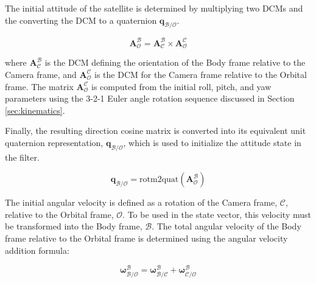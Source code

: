 
The initial attitude of the satellite is determined by multiplying two DCMs and the converting the DCM to a quaternion $\mathbf{q}_\mathcal{B/O} $.

\begin{equation}
    \mathbf{A}_\mathcal{O}^\mathcal{B} = \mathbf{A}_\mathcal{C}^\mathcal{B} \times \mathbf{A}_\mathcal{O}^\mathcal{C} 
\end{equation}

\noindent
where $\mathbf{A}_\mathcal{C}^\mathcal{B}$ is the DCM defining the orientation of the Body frame relative to the Camera frame, and $\mathbf{A}_\mathcal{O}^\mathcal{C}$ 
is the DCM for the Camera frame relative to the Orbital frame. The matrix $\mathbf{A}_\mathcal{O}^\mathcal{C}$ is computed from the initial roll, pitch, and 
yaw parameters using the 3-2-1 Euler angle rotation sequence discussed in Section \ref{sec:kinematics}.
\vspace{0.5cm}

\noindent
Finally, the resulting direction cosine matrix is converted into its equivalent unit quaternion representation, $\mathbf{q}_\mathcal{B/O}$, which is used to initialize the attitude state in the filter.

\begin{equation*}
    \mathbf{q}_\mathcal{B/O} = \text{rotm2quat}(\mathbf{A}_\mathcal{O}^\mathcal{B})
\end{equation*}


The initial angular velocity is defined as a rotation of the Camera frame, $\mathcal{C}$, relative to the Orbital frame, $\mathcal{O}$. To be used in the state vector, this velocity must be transformed into the Body frame, $\mathcal{B}$. The total angular velocity of the Body frame relative to the Orbital frame is determined using the angular velocity addition formula:

\begin{equation}
    \boldsymbol{\omega}_{\mathcal{B/O}}^{\mathcal{B}} = \boldsymbol{\omega}_{\mathcal{B/C}}^{\mathcal{B}} + \boldsymbol{\omega}_{\mathcal{C/O}}^{\mathcal{B}}
\end{equation}

